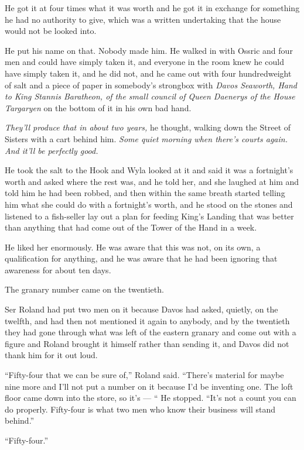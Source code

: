 He got it at four times what it was worth and he got it in exchange for something he had no authority to give, which was a written undertaking that the house would not be looked into.

He put his name on that. Nobody made him. He walked in with Ossric and four men and could have simply taken it, and everyone in the room knew he could have simply taken it, and he did not, and he came out with four hundredweight of salt and a piece of paper in somebody’s strongbox with \textit{Davos Seaworth, Hand to King Stannis Baratheon, of the small council of Queen Daenerys of the House Targaryen} on the bottom of it in his own bad hand.

\textit{They’ll produce that in about two years,} he thought, walking down the Street of Sisters with a cart behind him. \textit{Some quiet morning when there’s courts again. And it’ll be perfectly good.}

He took the salt to the Hook and Wyla looked at it and said it was a fortnight’s worth and asked where the rest was, and he told her, and she laughed at him and told him he had been robbed, and then within the same breath started telling him what she could do with a fortnight’s worth, and he stood on the stones and listened to a fish-seller lay out a plan for feeding King’s Landing that was better than anything that had come out of the Tower of the Hand in a week.

He liked her enormously. He was aware that this was not, on its own, a qualification for anything, and he was aware that he had been ignoring that awareness for about ten days.

\sceneBreak

The granary number came on the twentieth.

Ser Roland had put two men on it because Davos had asked, quietly, on the twelfth, and had then not mentioned it again to anybody, and by the twentieth they had gone through what was left of the eastern granary and come out with a figure and Roland brought it himself rather than sending it, and Davos did not thank him for it out loud.

“Fifty-four that we can be sure of,” Roland said. “There’s material for maybe nine more and I’ll not put a number on it because I’d be inventing one. The loft floor came down into the store, so it’s — “ He stopped. “It’s not a count you can do properly. Fifty-four is what two men who know their business will stand behind.”

“Fifty-four.”

